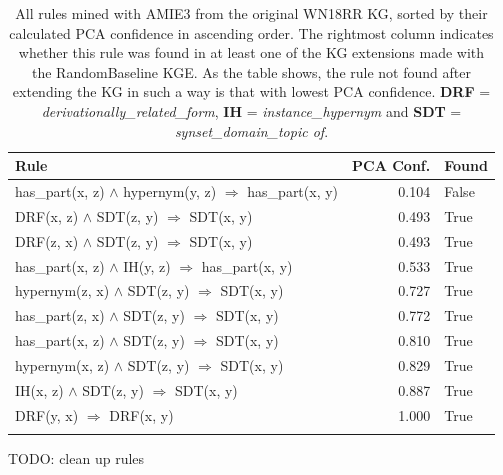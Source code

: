 \begin{longtable}{lrl}
\toprule
                                                                                                      Rule &  PCA Conf. &  Found \\
\midrule
                                               has\_part(x, z) $\wedge$ hypernym(y, z)   $\Rightarrow$ has\_part(x, y) &           0.104 &                    False \\
DRF(x, z) $\wedge$ SDT(z, y)   $\Rightarrow$ SDT(x, y) &           0.493 &                     True \\
DRF(z, x) $\wedge$ SDT(z, y)   $\Rightarrow$ SDT(x, y) &           0.493 &                     True \\
                                      has\_part(x, z) $\wedge$ IH(y, z)   $\Rightarrow$ has\_part(x, y) &           0.533 &                     True \\
                   hypernym(z, x) $\wedge$ SDT(z, y)   $\Rightarrow$ SDT(x, y) &           0.727 &                     True \\
                   has\_part(z, x) $\wedge$ SDT(z, y)   $\Rightarrow$ SDT(x, y) &           0.772 &                     True \\
                   has\_part(x, z) $\wedge$ SDT(z, y)   $\Rightarrow$ SDT(x, y) &           0.810 &                     True \\
                   hypernym(x, z) $\wedge$ SDT(z, y)   $\Rightarrow$ SDT(x, y) &           0.829 &                     True \\
          IH(x, z) $\wedge$ SDT(z, y)   $\Rightarrow$ SDT(x, y) &           0.887 &                     True \\
                            DRF(y, x)   $\Rightarrow$ DRF(x, y) &           1.000 &                     True \\
\bottomrule
\caption{All rules mined with AMIE3 from the original WN18RR KG, sorted by their calculated PCA confidence in ascending order. The rightmost column indicates whether this rule was found in at least one of the KG extensions made with the RandomBaseline KGE. As the table shows, the rule not found after extending the KG in such a way is that with lowest PCA confidence. \textbf{DRF} = \textit{derivationally\_related\_form}, \textbf{IH} = \textit{instance\_hypernym} and \textbf{SDT} = \textit{synset\_domain\_topic of}.}
\label{original_rules_found_by_baseline_WN18RR}
\end{longtable}

TODO: clean up rules

